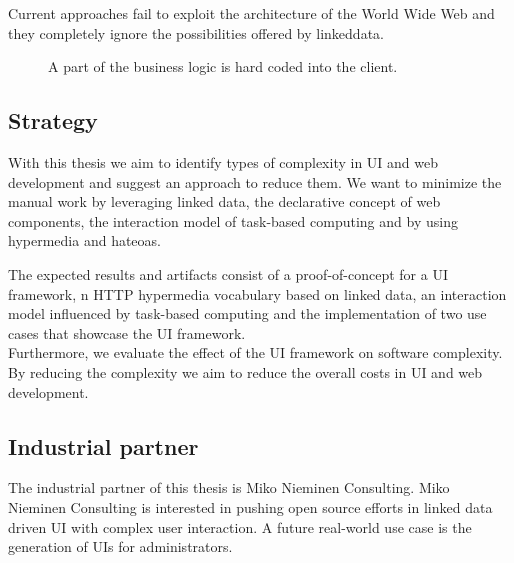 Current approaches fail to exploit the architecture of the World Wide Web and they completely ignore the possibilities offered by \gls{linkeddata}.

\begin{figure}[!htb]
  \caption{A part of the business logic is hard coded into the client.}
  \label{fig:hardcoded}
\end{figure}

\subsection{Strategy}\label{strategy}
With this thesis we aim to identify types of complexity in UI and web development and suggest an approach to reduce them.
We want to minimize the manual work by leveraging \gls{linked data}, the declarative concept of web components, the interaction model of task-based computing and by using \gls{hypermedia} and \gls{hateoas}.

The expected results and artifacts consist of a proof-of-concept for a UI framework, n HTTP \gls{hypermedia} vocabulary based on \gls{linked data}, an interaction model influenced by task-based computing and the implementation of two use cases that showcase the UI framework. \\
Furthermore, we evaluate the effect of the UI framework on software complexity. By reducing the complexity we aim to reduce the overall costs in UI and web development.

\subsection{Industrial partner}
The industrial partner of this thesis is Miko Nieminen Consulting. Miko Nieminen Consulting is interested in pushing open source efforts in \gls{linked data} driven UI with complex user interaction. A future real-world use case is the generation of UIs for administrators.
